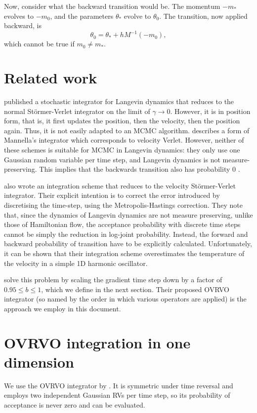 \documentclass{article}
\begin{document}
Now, consider what the backward transition would be. The momentum \(-m_*\)
evolves to \(-m_0\), and the parameters \(\theta_*\) evolve to \(\theta_0\). The
transition, now applied backward, is
\begin{equation}
  \theta_0 = \theta_* + h M^{-1} (-m_0),
\end{equation}
which cannot be true if \(m_0 \ne m_*\).

\section{Related work}

\citet{mannella2004} published a stochastic integrator for Langevin dynamics
that reduces to the normal Störmer-Verlet integrator on the limit of $\gamma \to
0$. However, it is in position form, that is, it first updates the position,
then the velocity, then the position again. Thus, it is not easily adapted to an
MCMC algorithm. \citet{groenbech-complete-verlet} describes a form of Mannella's
integrator which corresponds to velocity Verlet. However, neither of these
schemes is suitable for MCMC in Langevin dynamics: they only use one Gaussian
random variable per time step, and Langevin dynamics is not measure-preserving.
This implies that the backwards transition also has probability 0
\citep{bussi-parrinello}.

\citet{bussi-parrinello} also wrote an integration scheme that reduces to the
velocity Störmer-Verlet integrator. Their explicit intention is to correct the
error introduced by discretising the time-step, using the Metropolis-Hastings
correction. They note that, since the dynamics of Langevin dynamics are not
measure preserving, unlike those of Hamiltonian flow, the acceptance probability
with discrete time steps cannot be simply the reduction in log-joint
probability. Instead, the forward and backward probability of transition have to
be explicitly calculated.
Unfortunately, it can be shown \citep{lm-aboba} that their integration scheme
overestimates the temperature of the velocity in a simple 1D harmonic
oscillator.

\citet{scc-time-rescaling} solve this problem by scaling the gradient time step
down by a factor of $0.95 \le b \le 1$, which we define in the next
section. Their proposed OVRVO integrator (so named by the order in which various
operators are applied) is the approach we employ in this document.

\section{OVRVO integration in one dimension}
\label{sec:org7376eca}
We use the OVRVO integrator by \cite{scc-time-rescaling}. It is symmetric
under time reversal and employs two independent Gaussian RVs per time step, so
its probability of acceptance is never zero and can be evaluated.
\end{document}
